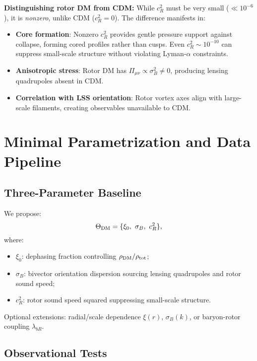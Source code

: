 \documentclass[11pt,a4paper]{article}
\numberwithin{equation}{section}
\theoremstyle{plain}
\theoremstyle{definition}
\theoremstyle{remark}
\begin{document}
\textbf{Distinguishing rotor DM from CDM:} While $c_R^2$ must be very small ($\ll 10^{-6}$), it is \emph{nonzero}, unlike CDM ($c_R^2 = 0$). The difference manifests in:
\begin{itemize}[leftmargin=*]
  \item \textbf{Core formation}: Nonzero $c_R^2$ provides gentle pressure support against collapse, forming cored profiles rather than cusps. Even $c_R^2 \sim 10^{-10}$ can suppress small-scale structure without violating Lyman-$\alpha$ constraints.
  \item \textbf{Anisotropic stress}: Rotor DM has $\Pi_{\mu\nu} \propto \sigma_B^2 \neq 0$, producing lensing quadrupoles absent in CDM.
  \item \textbf{Correlation with LSS orientation}: Rotor vortex axes align with large-scale filaments, creating observables unavailable to CDM.
\end{itemize}

\vspace{1em}

\section{Minimal Parametrization and Data Pipeline}\label{sec:pipeline}

\subsection{Three-Parameter Baseline}

We propose:
\begin{equation}
\Theta_{\rm DM}=\{\xi_0,\ \sigma_B,\ c_R^2\},
\label{eq:params}
\end{equation}
where:
\begin{itemize}[leftmargin=*]
  \item $\xi_0$: dephasing fraction controlling $\rho_{\rm DM}/\rho_{\rm tot}$;
  \item $\sigma_B$: bivector orientation dispersion sourcing lensing quadrupoles and rotor sound speed;
  \item $c_R^2$: rotor sound speed squared suppressing small-scale structure.
\end{itemize}

Optional extensions: radial/scale dependence $\xi(r)$, $\sigma_B(k)$, or baryon-rotor coupling $\lambda_{bR}$.

\subsection{Observational Tests}
\end{document}
